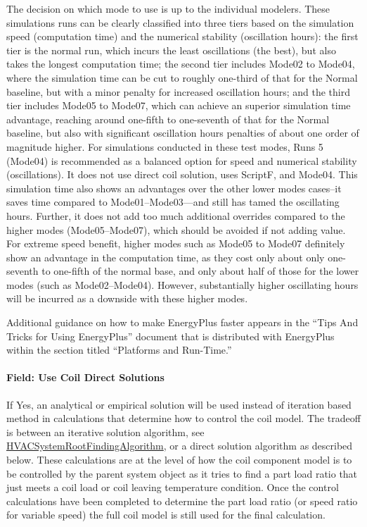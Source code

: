 The decision on which mode to use is up to the individual modelers. These simulations runs can be clearly classified into three tiers based on the simulation speed (computation time) and the numerical stability (oscillation hours): the first tier is the normal run, which incurs the least oscillations (the best), but also takes the longest computation time; the second tier includes Mode02 to Mode04, where the simulation time can be cut to roughly one-third of that for the Normal baseline, but with a minor penalty for increased oscillation hours; and the third tier includes Mode05 to Mode07, which can achieve an superior simulation time advantage, reaching around one-fifth to one-seventh of that for the Normal baseline, but also with significant oscillation hours penalties of about one order of magnitude higher. For simulations conducted in these test modes, Runs 5 (Mode04) is recommended as a balanced option for speed and numerical stability (oscillations). It does not use direct coil solution, uses ScriptF, and Mode04. This simulation time also shows an advantages over the other lower modes cases--it saves time compared to Mode01--Mode03---and still has tamed the oscillating hours. Further, it does not add too much additional overrides compared to the higher modes (Mode05--Mode07), which should be avoided if not adding value. For extreme speed benefit, higher modes such as Mode05 to Mode07 definitely show an advantage in the computation time, as they cost only about only one-seventh to one-fifth of the normal base, and only about half of those for the lower modes (such as Mode02--Mode04). However, substantially higher oscillating hours will be incurred as a downside with these higher modes.

Additional guidance on how to make EnergyPlus faster appears in the ``Tips And Tricks for Using EnergyPlus'' document that is distributed with EnergyPlus within the section titled ``Platforms and Run-Time.''

\paragraph{Field: Use Coil Direct Solutions}\label{use-coil-direct-solutions}

If Yes, an analytical or empirical solution will be used instead of iteration based method in calculations that determine how to control the coil model.  The tradeoff is between an iterative solution algorithm, see \hyperref[hvacystemrootfindingalgorithm]{HVACSystemRootFindingAlgorithm}, or a direct solution algorithm as described below.  These calculations are at the level of how the coil component model is to be controlled by the parent system object as it tries to find a part load ratio that just meets a coil load or coil leaving temperature condition.  Once the control calculations have been completed to determine the part load ratio (or speed ratio for variable speed) the full coil model is still used for the final calculation.

